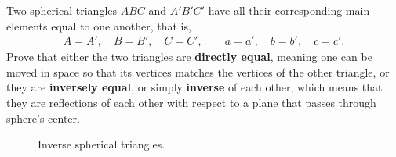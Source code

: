 \begin{tcolorbox}[title={Inverse Spherical Triangles}]
    \begin{question}
        Two spherical triangles $ABC$ and $A'B'C'$ have all their corresponding main elements equal to one another, that is,
        \begin{align*}
            A= A', \quad B=B',\quad C=C', \qquad
            a=a', \quad b=b',\quad c=c'.
        \end{align*}
        Prove that either the two triangles are \textbf{directly equal}, meaning one can be moved in space so that its vertices matches the vertices of the other triangle, or they are \textbf{inversely equal}, or simply \textbf{inverse} of each other, which means that they are reflections of each other with respect to a plane that passes through sphere's center.
        \begin{figure}[H]
            \centering
            \caption{Inverse spherical triangles.}
            \label{fig:inverse}
        \end{figure}
    \end{question}
\end{tcolorbox}


